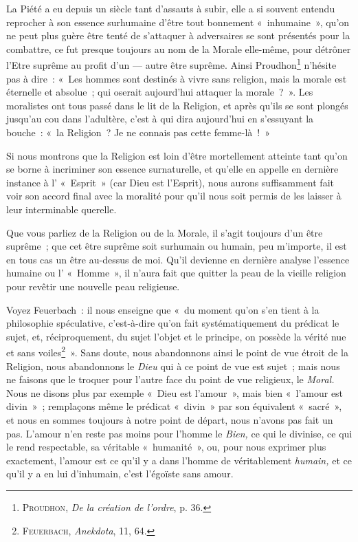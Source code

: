 \documentclass[french,twoside]{book} %
\begin{document}
\noindent La Piété a eu depuis un siècle tant d’assauts à subir, elle a si souvent entendu reprocher à son essence surhumaine d’être tout bonnement « inhumaine », qu’on ne peut plus guère être tenté de s’attaquer à adversaires se sont présentés pour la combattre, ce fut presque toujours au nom de la Morale elle-même, pour détrôner l’Etre suprême au profit d’un — autre être suprême. Ainsi Proudhon\footnote{ \noindent P{\scshape roudhon}, \emph{De la création de l’ordre}, p. 36.
 } n’hésite pas à dire : « Les hommes sont destinés à vivre sans religion, mais la morale est éternelle et absolue ; qui oserait aujourd’hui attaquer la  morale ? ». Les moralistes ont tous passé dans le lit de la Religion, et après qu’ils se sont plongés jusqu’au cou dans l’adultère, c’est à qui dira aujourd’hui en s’essuyant la bouche : « la Religion ? Je ne connais pas cette femme-là ! »\par
Si nous montrons que la Religion est loin d’être mortellement atteinte tant qu’on se borne à incriminer son essence surnaturelle, et qu’elle en appelle en dernière instance à l’ « Esprit » (car Dieu est l’Esprit), nous aurons suffisamment fait voir son accord final avec la moralité pour qu’il nous soit permis de les laisser à leur interminable querelle.\par
Que vous parliez de la Religion ou de la Morale, il s’agit toujours d’un être suprême ; que cet être suprême soit surhumain ou humain, peu m’importe, il est en tous cas un être au-dessus de moi. Qu’il devienne en dernière analyse l’essence humaine ou l’ « Homme », il n’aura fait que quitter la peau de la vieille religion pour revêtir une nouvelle peau religieuse.\par
Voyez Feuerbach : il nous enseigne que « du moment qu’on s’en tient à la philosophie spéculative, c’est-à-dire qu’on fait systématiquement du prédicat le sujet, et, réciproquement, du sujet l’objet et le principe, on possède la vérité nue et sans voiles\footnote{ \noindent F{\scshape euerbach}, \emph{Anekdota}, 11, 64.
 } ». Sans doute, nous abandonnons ainsi le point de vue étroit de la Religion, nous abandonnons le \emph{Dieu} qui à ce point de vue est sujet ; mais nous ne faisons que le troquer pour l’autre face du point de vue religieux, le \emph{Moral.} Nous ne disons plus par exemple « Dieu est l’amour », mais bien « l’amour est divin » ; remplaçons même le prédicat « divin » par son équivalent « sacré », et nous en sommes toujours à notre point de départ, nous n’avons pas fait un pas. L’amour n’en reste pas moins pour l’homme le \emph{Bien,} ce qui le divinise, ce qui le rend respectable, sa véritable « humanité »,  ou, pour nous exprimer plus exactement, l’amour est ce qu’il y a dans l’homme de véritablement \emph{humain,} et ce qu’il y a en lui d’inhumain, c’est l’égoïste sans amour.\par
\end{document}
